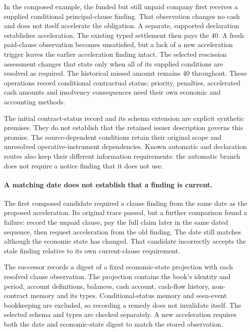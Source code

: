 In the composed example, the funded but still unpaid company first receives
a supplied conditional principal-clause finding. That observation changes no
cash and does not itself accelerate the obligation. A separate, supported
declaration establishes acceleration. The existing typed settlement then pays
the 40. A fresh paid-clause observation becomes unsatisfied, but a lack of a
new acceleration trigger leaves the earlier acceleration finding intact.
The selected rescission assessment changes that state only when all of its
supplied conditions are resolved as required. The historical missed amount
remains 40 throughout. These operations record conditional contractual status;
priority, penalties, accelerated cash amounts and insolvency consequences need
their own economic and accounting methods.

The initial contract-status record and its schema extension are explicit
synthetic premises. They do not establish that the retained issuer description
governs this promise. The source-dependent conditions retain their original
scope and unresolved operative-instrument dependencies. Known automatic and
declaration routes also keep their different information requirements: the
automatic branch does not require a notice finding that it does not use.

\paragraph{A matching date does not establish that a finding is current.}
The first composed candidate required a clause finding from the same date as
the proposed acceleration. Its original trace passed, but a further comparison
found a failure: record the unpaid clause, pay the full claim later in the same
dated sequence, then request acceleration from the old finding. The date still
matches although the economic state has changed. That candidate incorrectly
accepts the stale finding relative to its own current-clause requirement.

The successor records a digest of a fixed economic-state projection with each
resolved clause observation. The projection contains the book's identity and
period, account definitions, balances, cash account, cash-flow history,
non-contract memory and its types. Conditional-status memory and seen-event
bookkeeping are excluded, so recording a remedy does not invalidate itself.
The selected schema and types are checked separately. A new acceleration
requires both the date and economic-state digest to match the stored observation.

